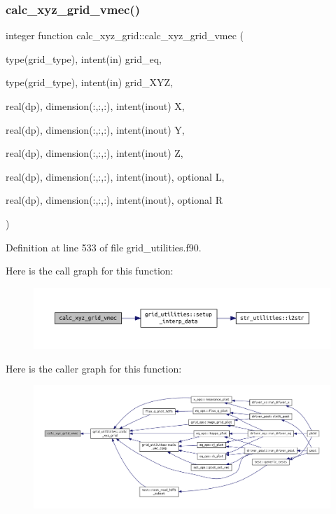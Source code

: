 \subsubsection{\texorpdfstring{calc\+\_\+xyz\+\_\+grid\+\_\+vmec()}{calc\_xyz\_grid\_vmec()}}
{\footnotesize\ttfamily integer function calc\+\_\+xyz\+\_\+grid\+::calc\+\_\+xyz\+\_\+grid\+\_\+vmec (\begin{DoxyParamCaption}\item[{type(grid\+\_\+type), intent(in)}]{grid\+\_\+eq,  }\item[{type(grid\+\_\+type), intent(in)}]{grid\+\_\+\+X\+YZ,  }\item[{real(dp), dimension(\+:,\+:,\+:), intent(inout)}]{X,  }\item[{real(dp), dimension(\+:,\+:,\+:), intent(inout)}]{Y,  }\item[{real(dp), dimension(\+:,\+:,\+:), intent(inout)}]{Z,  }\item[{real(dp), dimension(\+:,\+:,\+:), intent(inout), optional}]{L,  }\item[{real(dp), dimension(\+:,\+:,\+:), intent(inout), optional}]{R }\end{DoxyParamCaption})}



Definition at line 533 of file grid\+\_\+utilities.\+f90.

Here is the call graph for this function\+:
\nopagebreak
\begin{figure}[H]
\begin{center}
\leavevmode
\includegraphics[width=350pt]{grid__utilities_8f90_aaabf4a8fdce3679e99ff8f8a9a30fcaf_cgraph}
\end{center}
\end{figure}
Here is the caller graph for this function\+:
\nopagebreak
\begin{figure}[H]
\begin{center}
\leavevmode
\includegraphics[width=350pt]{grid__utilities_8f90_aaabf4a8fdce3679e99ff8f8a9a30fcaf_icgraph}
\end{center}
\end{figure}
\mbox{\label{grid__utilities_8f90_af4a8f2c9e0c72e80e6cbac35617e5f80}} 
